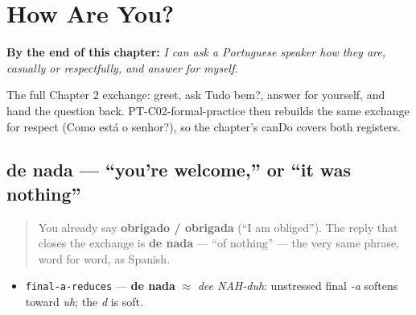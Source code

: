 
\chapter{How Are You?}
\label{ch:pt-how-are-you}

\begin{chapteropening}
\textbf{By the end of this chapter:} \emph{I can ask a Portuguese speaker how they are, casually or respectfully, and answer for myself.}

The full Chapter 2 exchange: greet, ask Tudo bem?, answer for yourself, and hand the question back. PT-C02-formal-practice then rebuilds the same exchange for respect (Como está o senhor?), so the chapter's canDo covers both registers.
\end{chapteropening}

\section[de nada]{de nada — \textquotedblleft{}you're welcome,\textquotedblright{} or \textquotedblleft{}it was nothing\textquotedblright{}}

\label{lesson:PT-C02-de-nada}



\begin{quote}
You already say \textbf{obrigado / obrigada} (\textquotedblleft{}I am obliged\textquotedblright{}). The reply that closes the exchange is \textbf{de nada} — \textquotedblleft{}of nothing\textquotedblright{} — the very same phrase, word for word, as Spanish.
\end{quote}

\begin{sounds}
\begin{itemize}
\raggedright
  \item \texttt{final-a-reduces} — \textbf{de nada} $\approx$ \emph{dee NAH-duh}: unstressed final \emph{-a} softens toward \emph{uh}; the \emph{d} is soft.
\end{itemize}
\end{sounds}

